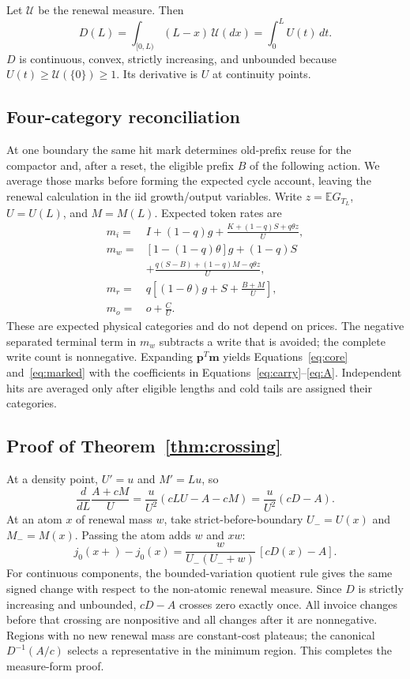 \documentclass[sigconf,screen,nonacm]{acmart}
\newcommand{\E}{\mathbb{E}}
\newcommand{\pp}{\boldsymbol{p}}
\newcommand{\Mvec}{\boldsymbol{m}}
\newcommand{\Core}{j_0}
\begin{document}
Let $\mathcal U$ be the renewal measure. Then
\begin{equation}
D(L)=\int_{[0,L)}(L-x)\,\mathcal U(dx)=\int_0^LU(t)\,dt.
\end{equation}
$D$ is continuous, convex, strictly increasing, and unbounded because
$U(t)\ge\mathcal U(\{0\})\ge1$. Its derivative is $U$ at continuity points.

\subsection{Four-category reconciliation}
At one boundary the same hit mark determines old-prefix reuse for the
compactor and, after a reset, the eligible prefix $B$ of the following action.
We average those marks before forming the expected cycle account, leaving
the renewal calculation in the iid growth/output variables.
Write $z=\E G_{T_L}$, $U=U(L)$, and $M=M(L)$. Expected token rates are
\begin{align}
m_i={}&I+(1-q)g+\frac{K+(1-q)S+q\theta z}{U},\\
m_w={}&[1-(1-q)\theta]g+(1-q)S\nonumber\\
 &+\frac{q(S-B)+(1-q)M-q\theta z}{U},\\
m_r={}&q\left[(1-\theta)g+S+\frac{B+M}{U}\right],\\
m_o={}&o+\frac C U.
\label{eq:basis}
\end{align}
These are expected physical categories and do not depend on prices. The
negative separated terminal term in $m_w$ subtracts a write that is avoided;
the complete write count is nonnegative. Expanding $\pp^T\Mvec$ yields
Equations~\eqref{eq:core} and~\eqref{eq:marked} with the coefficients in
Equations~\eqref{eq:carry}--\eqref{eq:A}. Independent hits are averaged only
after eligible lengths and cold tails are assigned their categories.

\subsection{Proof of Theorem~\ref{thm:crossing}}
At a density point, $U'=u$ and $M'=Lu$, so
\begin{equation}
\frac{d}{dL}\frac{A+cM}{U}
=\frac{u}{U^2}(cLU-A-cM)=\frac{u}{U^2}(cD-A).
\end{equation}
At an atom $x$ of renewal mass $w$, take strict-before-boundary
$U_-=U(x)$ and $M_-=M(x)$. Passing the atom adds $w$ and $xw$:
\begin{equation}
\Core(x+)-\Core(x)
=\frac{w}{U_-(U_-+w)}\,[cD(x)-A].
\label{eq:atomjump}
\end{equation}
For continuous components, the bounded-variation quotient rule gives the
same signed change with respect to the non-atomic renewal measure. Since
$D$ is strictly increasing and unbounded, $cD-A$ crosses zero exactly once.
All invoice changes before that crossing are nonpositive and all changes
after it are nonnegative. Regions with no new renewal mass are constant-cost
plateaus; the canonical $D^{-1}(A/c)$ selects a representative in the minimum
region. This completes the measure-form proof.
\end{document}
